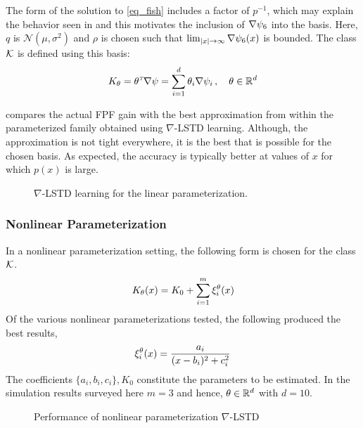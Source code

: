 The form of the solution to \eqref{eq_fish} includes a factor of $p^{-1}$, which may explain the behavior seen in  and this motivates the inclusion of $\nabla \psi_{6}$ into the basis. Here, $q$ is $\mathcal{N}(\mu,\sigma^{2})$ and $\rho$ is chosen such that $\lim_{|x|\to\infty}\nabla \psi_{6}(x)$ is bounded. The class ${\cal K}$ is defined using this basis:
\begin{equation*}
K_\theta = \theta^{{\hbox{\tiny\it T}}}\nabla \psi = \sum_{i=1}^{d}\theta_{i}\nabla \psi_{i}\,, \quad\theta\in\mathbb{R}^d
\end{equation*}

 compares the actual FPF gain with the best approximation from within the parameterized family obtained using $\nabla$-LSTD learning. Although, the approximation is not tight everywhere, it is the best that is possible for the chosen basis. As expected, the accuracy is typically better at values of $x$ for which $p(x)$ is large.

\begin{figure}[h]
	\caption{$\nabla$-LSTD learning for the linear parameterization.}
	\label{f:lstd}
\end{figure}

\subsubsection*{Nonlinear Parameterization}
\label{sec_nl_param}
In a nonlinear parameterization setting, the following form is chosen for the class ${\cal K}$.
\begin{equation*}
K_\theta(x) = K_{0} + \sum_{i=1}^m \xi_{i}^{\theta}(x)
\end{equation*}
Of the various nonlinear parameterizations tested, the following produced the best results,
\begin{equation*}
\xi_{i}^{\theta}(x) = \dfrac{a_{i}}{(x -b_{i})^2 + c_{i}^2}
\end{equation*}
The coefficients $\{a_{i}, b_{i}, c_{i} \}, K_{0}$ constitute the parameters to be estimated.
In the simulation results surveyed here  $m=3$ and hence, $\theta \in \mathbb{R}^{d}$ with $d=10$.
\begin{figure}[h]
	\caption{Performance of nonlinear parameterization $\nabla$-LSTD}
	\label{f:nltd}
\end{figure}

